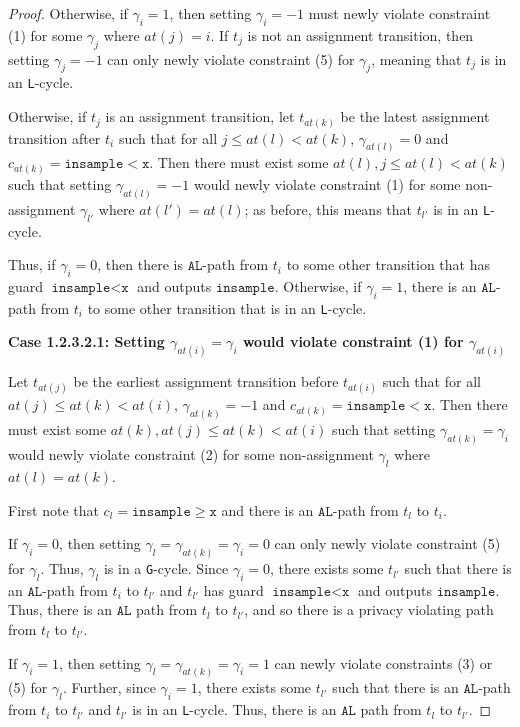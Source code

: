 \documentclass[12pt]{article}
\newcommand{\gguard}[1][x]{\texttt{insample}\geq #1}
\newcommand{\lguard}[1][x]{\texttt{insample} < #1}
\newcommand{\gcycle}{\texttt{G}-cycle}
\newcommand{\lcycle}{\texttt{L}-cycle}
\theoremstyle{definition}
\begin{document}
\begin{proof}
    Otherwise, if $\gamma_i = 1$, then setting $\gamma_i = -1$ must newly violate constraint (1) for some $\gamma_j$ where $at(j) = i$. If $t_{j}$ is not an assignment transition, then setting $\gamma_{j} = -1$ can only newly violate constraint (5) for $\gamma_{j}$, meaning that $t_j$ is in an \lcycle. 

    Otherwise, if $t_j$ is an assignment transition, let $t_{at(k)}$ be the latest assignment transition after $t_{i}$ such that for all $j\leq at(l)< at(k)$, $\gamma_{at(l)} =0$ and $c_{at(k)} = \lguard[\texttt{x}]$. Then there must exist some $at(l), j\leq at(l)< at(k)$ such that setting $\gamma_{at(l)}=-1$ would newly violate constraint (1) for some non-assignment $\gamma_{l'}$ where $at(l') = at(l)$; as before, this means that $t_{l'}$ is in an \lcycle.  

    Thus, if $\gamma_i =0$, then there is $\texttt{AL}$-path from $t_i$ to some other transition that has guard $\lguard[\texttt{x}]$ and outputs $\texttt{insample}$. Otherwise, if $\gamma_i = 1$, there is an $\texttt{AL}$-path from $t_i$ to some other transition that is in an \lcycle. 

    \textbf{Case 1.2.3.2.1: Setting $\gamma_{at(i)} = \gamma_i$ would violate constraint (1) for $\gamma_{at(i)}$}

    Let $t_{at(j)}$ be the earliest assignment transition before $t_{at(i)}$ such that for all $at(j)\leq at(k)< at(i)$, $\gamma_{at(k)} =-1$ and $c_{at(k)} = \lguard[\texttt{x}]$. Then there must exist some $at(k), at(j)\leq at(k)< at(i)$ such that setting $\gamma_{at(k)}=\gamma_i$ would newly violate constraint (2) for some non-assignment $\gamma_l$ where $at(l) = at(k)$.

    First note that $c_l = \gguard[\texttt{x}]$ and there is an $\texttt{AL}$-path from $t_l$ to $t_i$. 
    
    If $\gamma_i = 0$, then setting $\gamma_l = \gamma_{at(k)} = \gamma_i = 0$ can only newly violate constraint (5) for $\gamma_l$. Thus, $\gamma_l$ is in a \gcycle. Since $\gamma_i = 0$, there exists some $t_{l'}$ such that there is an $\texttt{AL}$-path from $t_i$ to $t_{l'}$ and $t_{l'}$ has guard $\lguard[\texttt{x}]$ and outputs $\texttt{insample}$. Thus, there is an $\texttt{AL}$ path from $t_l$ to $t_{l'}$, and so there is a privacy violating path from $t_l$ to $t_{l'}$. 
    
    If $\gamma_i = 1$, then setting $\gamma_l = \gamma_{at(k)} = \gamma_i = 1$ can newly violate constraints (3) or (5) for $\gamma_l$. Further, since $\gamma_i =1$, there exists some $t_{l'}$ such that there is an $\texttt{AL}$-path from $t_i$ to $t_{l'}$ and $t_{l'}$ is in an \lcycle. Thus, there is an $\texttt{AL}$ path from $t_l$ to $t_{l'}$.
    

\end{proof}
\end{document}
